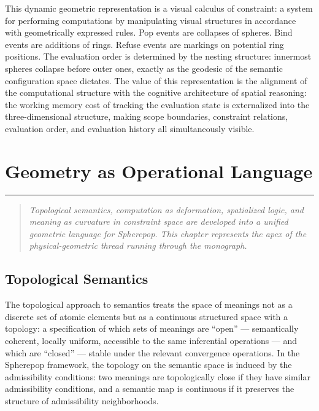 \documentclass[12pt,openany]{book}
\theoremstyle{plain}
\theoremstyle{definition}
\theoremstyle{remark}
\newcommand{\chapterrule}{%
  \vspace{4pt}%
  {\color{SpherepopBlue}\rule{\textwidth}{0.8pt}}%
  \vspace{10pt}%
}
\newenvironment{chapterprecis}{%
  \begin{quote}\small\itshape}{%
  \end{quote}\medskip}
\begin{document}
This dynamic geometric representation is a visual calculus of constraint: a system for performing computations by manipulating visual structures in accordance with geometrically expressed rules. Pop events are collapses of spheres. Bind events are additions of rings. Refuse events are markings on potential ring positions. The evaluation order is determined by the nesting structure: innermost spheres collapse before outer ones, exactly as the geodesic of the semantic configuration space dictates. The value of this representation is the alignment of the computational structure with the cognitive architecture of spatial reasoning: the working memory cost of tracking the evaluation state is externalized into the three-dimensional structure, making scope boundaries, constraint relations, evaluation order, and evaluation history all simultaneously visible.

\chapter{Geometry as Operational Language}
\chapterrule

\begin{chapterprecis}
Topological semantics, computation as deformation, spatialized
logic, and meaning as curvature in constraint space are developed
into a unified geometric language for Spherepop. This chapter
represents the apex of the physical-geometric thread running
through the monograph.
\end{chapterprecis}

\section{Topological Semantics}

The topological approach to semantics treats the space of meanings not as a discrete set of atomic elements but as a continuous structured space with a topology: a specification of which sets of meanings are \enquote{open} — semantically coherent, locally uniform, accessible to the same inferential operations — and which are \enquote{closed} — stable under the relevant convergence operations. In the Spherepop framework, the topology on the semantic space is induced by the admissibility conditions: two meanings are topologically close if they have similar admissibility conditions, and a semantic map is continuous if it preserves the structure of admissibility neighborhoods.
\end{document}
